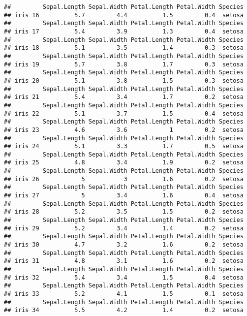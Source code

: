 \documentclass[
]{article}
\begin{document}
\begin{verbatim}
##         Sepal.Length Sepal.Width Petal.Length Petal.Width Species
## iris 16          5.7         4.4          1.5         0.4  setosa
##         Sepal.Length Sepal.Width Petal.Length Petal.Width Species
## iris 17          5.4         3.9          1.3         0.4  setosa
##         Sepal.Length Sepal.Width Petal.Length Petal.Width Species
## iris 18          5.1         3.5          1.4         0.3  setosa
##         Sepal.Length Sepal.Width Petal.Length Petal.Width Species
## iris 19          5.7         3.8          1.7         0.3  setosa
##         Sepal.Length Sepal.Width Petal.Length Petal.Width Species
## iris 20          5.1         3.8          1.5         0.3  setosa
##         Sepal.Length Sepal.Width Petal.Length Petal.Width Species
## iris 21          5.4         3.4          1.7         0.2  setosa
##         Sepal.Length Sepal.Width Petal.Length Petal.Width Species
## iris 22          5.1         3.7          1.5         0.4  setosa
##         Sepal.Length Sepal.Width Petal.Length Petal.Width Species
## iris 23          4.6         3.6            1         0.2  setosa
##         Sepal.Length Sepal.Width Petal.Length Petal.Width Species
## iris 24          5.1         3.3          1.7         0.5  setosa
##         Sepal.Length Sepal.Width Petal.Length Petal.Width Species
## iris 25          4.8         3.4          1.9         0.2  setosa
##         Sepal.Length Sepal.Width Petal.Length Petal.Width Species
## iris 26            5           3          1.6         0.2  setosa
##         Sepal.Length Sepal.Width Petal.Length Petal.Width Species
## iris 27            5         3.4          1.6         0.4  setosa
##         Sepal.Length Sepal.Width Petal.Length Petal.Width Species
## iris 28          5.2         3.5          1.5         0.2  setosa
##         Sepal.Length Sepal.Width Petal.Length Petal.Width Species
## iris 29          5.2         3.4          1.4         0.2  setosa
##         Sepal.Length Sepal.Width Petal.Length Petal.Width Species
## iris 30          4.7         3.2          1.6         0.2  setosa
##         Sepal.Length Sepal.Width Petal.Length Petal.Width Species
## iris 31          4.8         3.1          1.6         0.2  setosa
##         Sepal.Length Sepal.Width Petal.Length Petal.Width Species
## iris 32          5.4         3.4          1.5         0.4  setosa
##         Sepal.Length Sepal.Width Petal.Length Petal.Width Species
## iris 33          5.2         4.1          1.5         0.1  setosa
##         Sepal.Length Sepal.Width Petal.Length Petal.Width Species
## iris 34          5.5         4.2          1.4         0.2  setosa

\end{verbatim}
\end{document}
